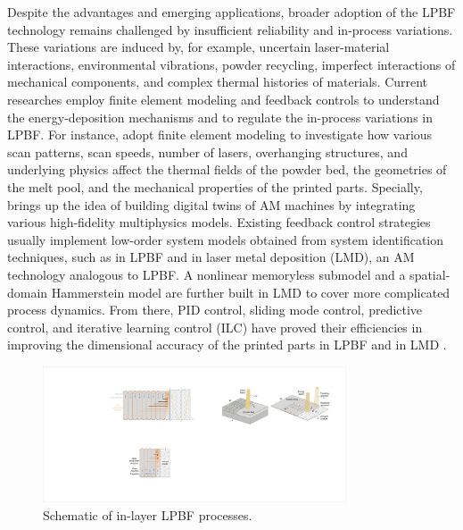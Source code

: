 \documentclass [11pt, proquest] {uwthesis}[2020/02/24]
\begin{document}
Despite the advantages and emerging applications, broader adoption of the LPBF technology remains
challenged by insufficient reliability and in-process variations.
These variations are induced by, for example, uncertain laser-material
interactions, environmental vibrations, powder recycling, imperfect
interactions of mechanical components, and complex thermal histories
of materials\cite{wang2018multirate,kruth2007feedback,seyda2012investigation}. Current researches employ finite element modeling and feedback controls to understand the energy-deposition
mechanisms and to regulate the in-process variations in LPBF. For instance,
\cite{masoomi2017laser,hussein2013finite,foroozmehr2016finite,khairallah2016laser}
adopt finite element modeling to investigate how various scan patterns,
scan speeds, number of lasers, overhanging structures, and underlying
physics affect the thermal fields of the powder bed, the geometries
of the melt pool, and the mechanical properties of the printed parts.
Specially, \cite{debroy2017building} brings up the idea of building
digital twins of AM machines by integrating various high-fidelity
multiphysics models. Existing feedback control strategies usually
implement low-order system models obtained from system identification
techniques, such as \cite{kruth2007feedback,craeghs2010feedback,zheng2020distributed}
in LPBF and \cite{song2011feedback,cao2015control,sammons2014repetitive}
in laser metal deposition (LMD), an AM technology analogous to LPBF.
A nonlinear memoryless submodel \cite{fathi2008geometry,cao2015control}
and a spatial-domain Hammerstein model \cite{sammons2014repetitive}
are further built in LMD to cover more complicated process dynamics.
From there, PID control, sliding mode control, predictive control,
and iterative learning control (ILC) have proved their efficiencies in improving
the dimensional accuracy of the printed parts in LPBF \cite{kruth2007feedback,craeghs2010feedback,vlasea2015development,fleming2020tracking}
and in LMD \cite{hofman2012camera,salehi2006melt,fathi2007clad,fathi2008geometry,song2011feedback,tang2011layer}.
\begin{figure}[!ht]
\begin{centering}
\includegraphics[clip,width=9cm]{Closed-loop-simulation/SLS schematic diagram-2}
\par\end{centering}
\centering{}\caption{\label{fig:Schematic-of-in-layer}Schematic of in-layer LPBF processes.}
\end{figure}
\end{document}
